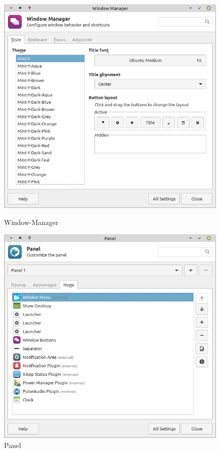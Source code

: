 \begin{figure}[!htp]
    \begin{minipage}{0.49\textwidth}
        \centering
        \includegraphics[width=\linewidth]
            {../input/task-2/3/Window-Manager.png}
        \caption{Window-Manager}
        \label{fig:Window-Manager}
    \end{minipage}
    \begin{minipage}{0.49\textwidth}
        \centering
        \includegraphics[width=\linewidth]
            {../input/task-2/3/Panel.png}
        \caption{Panel}
        \label{fig:Panel}
    \end{minipage}
\end{figure}

